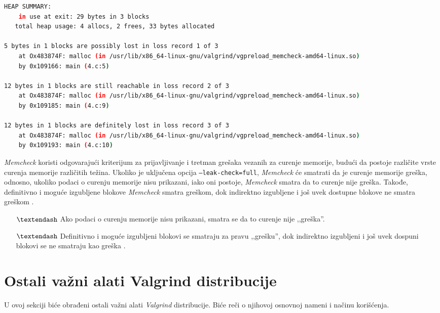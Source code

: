 \documentclass[12pt,oneside]{memoir}
\theoremstyle{plain}
\theoremstyle{definition}
\begin{document}
\begin{lstlisting}[style=terminal,caption={Izveštaj o curenju memorije}, label={lst:slika2.14},language={bash}] 
HEAP SUMMARY:
    in use at exit: 29 bytes in 3 blocks
   total heap usage: 4 allocs, 2 frees, 33 bytes allocated
   
5 bytes in 1 blocks are possibly lost in loss record 1 of 3
    at Ox483874F: malloc (in /usr/lib/x86_64-linux-gnu/valgrind/vgpreload_memcheck-amd64-linux.so)
    by 0x109166: main (4.c:5)

12 bytes in 1 blocks are still reachable in loss record 2 of 3
    at Ox483874F: malloc (in /usr/lib/x86_64-linux-gnu/valgrind/vgpreload_memcheck-amd64-linux.so)
    by 0x109185: main (4.c:9)

12 bytes in 1 blocks are definitely lost in loss record 3 of 3
    at Ox483874F: malloc (in /usr/lib/x86_64-linux-gnu/valgrind/vgpreload_memcheck-amd64-linux.so)
    by 0x109193: main (4.c:10)
\end{lstlisting}

\textit{Memcheck} koristi odgovarajući kriterijum za prijavljivanje i tretman grešaka vezanih za curenje memorije, budući da postoje različite vrste curenja memorije različitih težina. Ukoliko je uključena opcija \texttt{--leak-check=full}, \textit{Memcheck} će smatrati da je curenje memorije greška, odnosno, ukoliko podaci o curenju memorije nisu prikazani, iako oni postoje, \textit{Memcheck} smatra da to curenje nije greška. Takođe, definitivno i moguće izgubljene blokove \textit{Memcheck} smatra greškom, dok indirektno izgubljene i još uvek dostupne blokove ne smatra greškom \cite{Memcheck}.

\begin{itemize}
\item[$\textendash$] Ako podaci o curenju memorije nisu prikazani, smatra se da to curenje nije ,,greška''.
\item[$\textendash$] Definitivno i moguće izgubljeni blokovi se smatraju za pravu ,,grešku'', dok indirektno izgubljeni i još uvek dospuni blokovi se ne smatraju kao greška \cite{ValgrindDOC}. 
\end{itemize}

\section{Ostali važni alati Valgrind distribucije}

U ovoj sekciji biće obrađeni ostali važni alati \textit{Valgrind} distribucije. Biće reči o njihovoj osnovnoj nameni i načinu korišćenja. 
\end{document}
